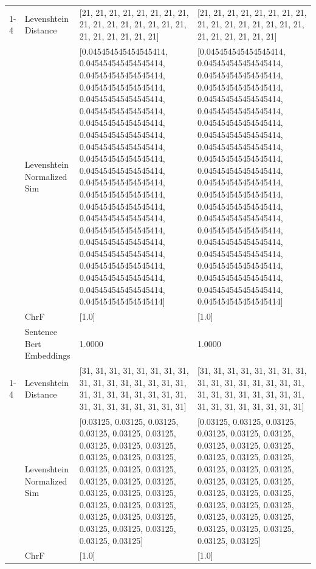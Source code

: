 \begin{tabular}{llll}
\cline{1-4}
\multirow[t]{4}{*}{Egetaracha nigo gekoiyia amabeho.} & Levenshtein Distance & [21, 21, 21, 21, 21, 21, 21, 21, 21, 21, 21, 21, 21, 21, 21, 21, 21, 21, 21, 21, 21, 21] & [21, 21, 21, 21, 21, 21, 21, 21, 21, 21, 21, 21, 21, 21, 21, 21, 21, 21, 21, 21, 21, 21] \\
 & Levenshtein Normalized Sim & [0.045454545454545414, 0.045454545454545414, 0.045454545454545414, 0.045454545454545414, 0.045454545454545414, 0.045454545454545414, 0.045454545454545414, 0.045454545454545414, 0.045454545454545414, 0.045454545454545414, 0.045454545454545414, 0.045454545454545414, 0.045454545454545414, 0.045454545454545414, 0.045454545454545414, 0.045454545454545414, 0.045454545454545414, 0.045454545454545414, 0.045454545454545414, 0.045454545454545414, 0.045454545454545414, 0.045454545454545414] & [0.045454545454545414, 0.045454545454545414, 0.045454545454545414, 0.045454545454545414, 0.045454545454545414, 0.045454545454545414, 0.045454545454545414, 0.045454545454545414, 0.045454545454545414, 0.045454545454545414, 0.045454545454545414, 0.045454545454545414, 0.045454545454545414, 0.045454545454545414, 0.045454545454545414, 0.045454545454545414, 0.045454545454545414, 0.045454545454545414, 0.045454545454545414, 0.045454545454545414, 0.045454545454545414, 0.045454545454545414] \\
 & ChrF & [1.0] & [1.0] \\
 & Sentence Bert Embeddings & 1.0000 & 1.0000 \\
\cline{1-4}
\multirow[t]{4}{*}{Nyomba nchora tiri konyora obuya.} & Levenshtein Distance & [31, 31, 31, 31, 31, 31, 31, 31, 31, 31, 31, 31, 31, 31, 31, 31, 31, 31, 31, 31, 31, 31, 31, 31, 31, 31, 31, 31, 31, 31, 31, 31] & [31, 31, 31, 31, 31, 31, 31, 31, 31, 31, 31, 31, 31, 31, 31, 31, 31, 31, 31, 31, 31, 31, 31, 31, 31, 31, 31, 31, 31, 31, 31, 31] \\
 & Levenshtein Normalized Sim & [0.03125, 0.03125, 0.03125, 0.03125, 0.03125, 0.03125, 0.03125, 0.03125, 0.03125, 0.03125, 0.03125, 0.03125, 0.03125, 0.03125, 0.03125, 0.03125, 0.03125, 0.03125, 0.03125, 0.03125, 0.03125, 0.03125, 0.03125, 0.03125, 0.03125, 0.03125, 0.03125, 0.03125, 0.03125, 0.03125, 0.03125, 0.03125] & [0.03125, 0.03125, 0.03125, 0.03125, 0.03125, 0.03125, 0.03125, 0.03125, 0.03125, 0.03125, 0.03125, 0.03125, 0.03125, 0.03125, 0.03125, 0.03125, 0.03125, 0.03125, 0.03125, 0.03125, 0.03125, 0.03125, 0.03125, 0.03125, 0.03125, 0.03125, 0.03125, 0.03125, 0.03125, 0.03125, 0.03125, 0.03125] \\
 & ChrF & [1.0] & [1.0] \\

\end{tabular}
